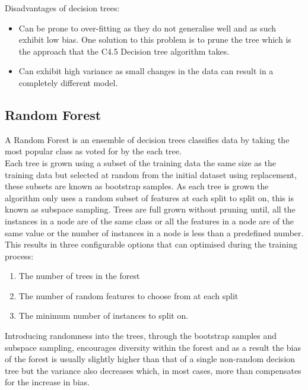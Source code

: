		Disadvantages of decision trees:
			\begin{itemize}
				\item Can be prone to over-fitting as they do not generalise well and as such exhibit low bias. One solution to this problem is to prune the tree which is the approach that the C4.5 Decision tree algorithm takes\cite{quinlan2014c4}.
				\item Can exhibit high variance as small changes in the data can result in a completely different model.
			\end{itemize}					

		\subsection{Random Forest}
					
		A Random Forest is an ensemble of decision trees classifies data by taking the most popular class as voted for by the each tree.\\
		
		Each tree is grown using a subset of the training data the same size as the training data but selected at random from the initial dataset using replacement, these subsets are known as bootstrap samples. As each tree is grown the algorithm only uses a random subset of features at each split to split on, this is known as subspace sampling. Trees are full grown without pruning until, all the instances in a node are of the same class or all the features in a node are of the same value or the number of instances in a node is less than a predefined number. This results in three configurable options that can optimised during the training process: 

		\begin{enumerate}
			\item The number of trees in the forest
			\item The number of random features to choose from at each split
			\item The minimum number of instances to split on.
		\end{enumerate}				
		
		Introducing randomness into the trees, through the bootstrap samples and subspace sampling, encourages diversity within the forest and as a result the bias of the forest is usually slightly higher than that of a single non-random decision tree but the variance also decreases which, in most cases, more than compensates for the increase in bias.\\

